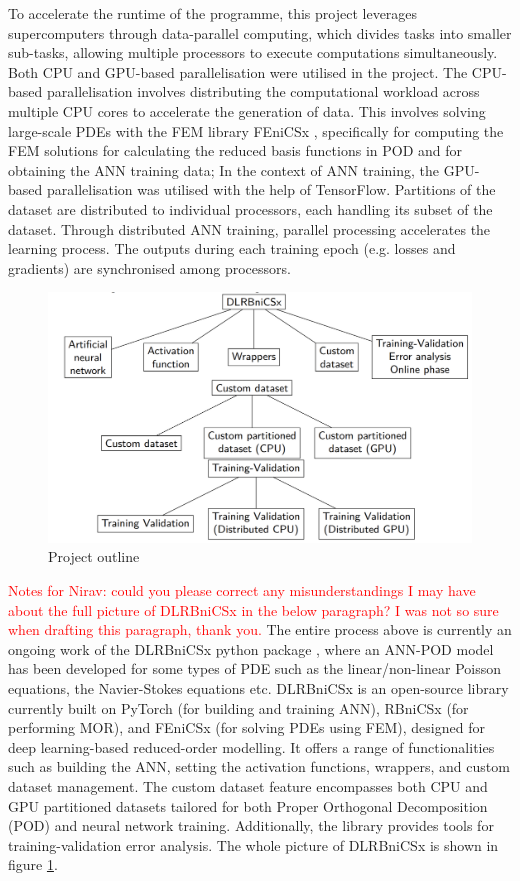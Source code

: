 To accelerate the runtime of the programme, this project leverages supercomputers through data-parallel computing, which divides tasks into smaller sub-tasks, allowing multiple processors to execute computations simultaneously. Both CPU and GPU-based parallelisation were utilised in the project. The CPU-based parallelisation involves distributing the computational workload across multiple CPU cores to accelerate the generation of data. This involves solving large-scale PDEs with the FEM library FEniCSx \cite{Baratta_DOLFINx_the_next_2023}, specifically for computing the FEM solutions for calculating the reduced basis functions in POD and for obtaining the ANN training data; In the context of ANN training, the GPU-based parallelisation was utilised with the help of TensorFlow. Partitions of the dataset are distributed to individual processors, each handling its subset of the dataset. Through distributed ANN training, parallel processing accelerates the learning process. The outputs during each training epoch (e.g. losses and gradients) are synchronised among processors. 


\begin{figure}[!h]
    \centering
    \includegraphics[width=0.7\linewidth]{parallel_fig/project_explain.png}
    \caption{Project outline}
    \label{fig:project_explain}
\end{figure}

\textcolor{red}{Notes for Nirav: could you please correct any misunderstandings I may have about the full picture of DLRBniCSx in the below paragraph? I was not so sure when drafting this paragraph, thank you.}
The entire process above is currently an ongoing work of the DLRBniCSx python package \cite{Nirav_Dlrbnicsx}, where an ANN-POD model has been developed for some types of PDE such as the linear/non-linear Poisson equations, the Navier-Stokes equations etc. DLRBniCSx is an open-source library currently built on PyTorch (for building and training ANN), RBniCSx \cite{Francesco_RBniCSx_2024}(for performing MOR), and FEniCSx (for solving PDEs using FEM), designed for deep learning-based reduced-order modelling. It offers a range of functionalities such as building the ANN, setting the activation functions, wrappers, and custom dataset management. The custom dataset feature encompasses both CPU and GPU partitioned datasets tailored for both Proper Orthogonal Decomposition (POD) and neural network training. Additionally, the library provides tools for training-validation error analysis. The whole picture of DLRBniCSx is shown in figure \ref{fig:project_explain}.

